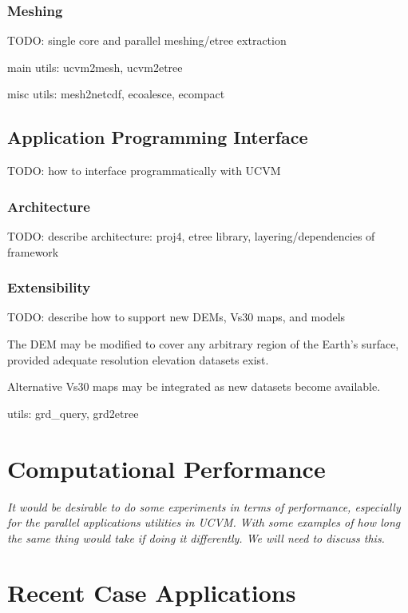 \subsubsection{Meshing}

TODO: single core and parallel meshing/etree extraction

main utils: ucvm2mesh, ucvm2etree

misc utils: mesh2netcdf, ecoalesce, ecompact

\subsection{Application Programming Interface}

TODO: how to interface programmatically with UCVM

\subsubsection{Architecture}

TODO: describe architecture: proj4, etree library, layering/dependencies of framework

\subsubsection{Extensibility}

TODO: describe how to support new DEMs, Vs30 maps, and models

The DEM may be modified to cover any arbitrary region of the Earth's surface, provided adequate resolution elevation datasets exist.

Alternative Vs30 maps may be integrated as new datasets become available. 

utils: grd\_query, grd2etree

\section{Computational Performance}
\label{sec:conclusions}

\textit{
\color{blue}
It would be desirable to do some experiments in terms of performance, especially for the parallel applications utilities in UCVM. With some examples of how long the same thing would take if doing it differently. We will need to discuss this.
}

\section{Recent Case Applications}
\label{sec:conclusions}


